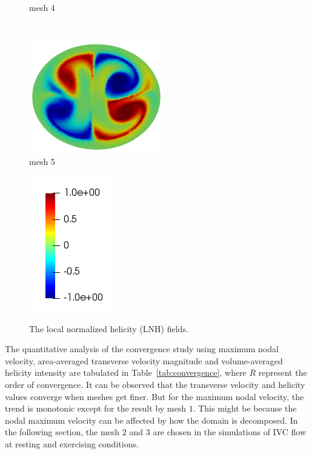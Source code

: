 \begin{figure}[htbp]
\begin{minipage}[c][2in][c]{0.4\linewidth}
        mesh 4
    \end{minipage}\\[.5\baselineskip]
    \begin{minipage}[c][2in][c]{0.4\linewidth}
        \centering
        \includegraphics[width=2.3in]{imgs/vena_cava/LNH_mesh5.png}\\
        mesh 5
    \end{minipage}
    \begin{minipage}[c][2in][c]{0.4\linewidth}
        \centering
        \includegraphics[width=.7in]{imgs/vena_cava/colormap_LNH.png}\\
    \end{minipage}
    \caption{The local normalized helicity (LNH) fields.}
    \label{fig:lnh}
\end{figure}

The quantitative analysis of the convergence study using maximum nodal velocity, area-averaged transverse velocity magnitude and volume-averaged helicity intensity are tabulated in Table~\ref{tab:convergence}, where $R$ represent the order of convergence.
It can be observed that the transverse velocity and helicity values converge when meshes get finer. But for the maximum nodal velocity, the trend is monotonic except for the result by mesh $1$. This might be because the nodal maximum velocity can be affected by how the domain is decomposed. In the following section, the mesh $2$ and $3$ are chosen in the simulations of IVC flow at resting and exercising conditions.

